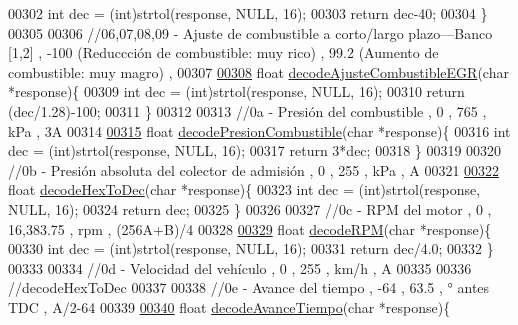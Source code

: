 \begin{DoxyCode}
{00302     \textcolor{keywordtype}{int} dec = (int)strtol(response, NULL, 16);
00303     \textcolor{keywordflow}{return} dec-40;
00304 \}
00305 
00306 \textcolor{comment}{//06,07,08,09 - Ajuste de combustible a corto/largo plazo—Banco [1,2] , -100 (Reduccción de combustible:
       muy rico) , 99.2 (Aumento de combustible: muy magro) , %
00307 
\hyperlink{decoders_8hpp_aeee9e6d8511a934b3a3644b19de3f2b7}{00308} \textcolor{keywordtype}{float} \hyperlink{decoders_8cpp_aeee9e6d8511a934b3a3644b19de3f2b7}{decodeAjusteCombustibleEGR}(\textcolor{keywordtype}{char} *response)\{
00309     \textcolor{keywordtype}{int} dec = (int)strtol(response, NULL, 16);
00310     \textcolor{keywordflow}{return} (dec/1.28)-100;
00311 \}
00312 
00313 \textcolor{comment}{//0a - Presión del combustible , 0 , 765 , kPa , 3A}
00314 
\hyperlink{decoders_8hpp_ab1c03e72734d4127a1c48f3b5a44a2e2}{00315} \textcolor{keywordtype}{float} \hyperlink{decoders_8cpp_ab1c03e72734d4127a1c48f3b5a44a2e2}{decodePresionCombustible}(\textcolor{keywordtype}{char} *response)\{
00316     \textcolor{keywordtype}{int} dec = (int)strtol(response, NULL, 16);
00317     \textcolor{keywordflow}{return} 3*dec;
00318 \}
00319 
00320 \textcolor{comment}{//0b - Presión absoluta del colector de admisión , 0 , 255 , kPa , A}
00321 
\hyperlink{decoders_8hpp_aa7c5243702d5462e4b638450e750624e}{00322} \textcolor{keywordtype}{float} \hyperlink{decoders_8cpp_aa7c5243702d5462e4b638450e750624e}{decodeHexToDec}(\textcolor{keywordtype}{char} *response)\{
00323     \textcolor{keywordtype}{int} dec = (int)strtol(response, NULL, 16);
00324     \textcolor{keywordflow}{return} dec;
00325 \}
00326 
00327 \textcolor{comment}{//0c - RPM del motor , 0 , 16,383.75 , rpm , (256A+B)/4 }
00328 
\hyperlink{decoders_8hpp_a889868c7b1e554aee496e6aed7101cc4}{00329} \textcolor{keywordtype}{float} \hyperlink{decoders_8cpp_a889868c7b1e554aee496e6aed7101cc4}{decodeRPM}(\textcolor{keywordtype}{char} *response)\{
00330     \textcolor{keywordtype}{int} dec = (int)strtol(response, NULL, 16);
00331     \textcolor{keywordflow}{return} dec/4.0;
00332 \}
00333 
00334 \textcolor{comment}{//0d - Velocidad del vehículo , 0 , 255 , km/h , A}
00335 
00336 \textcolor{comment}{//decodeHexToDec}
00337 
00338 \textcolor{comment}{//0e - Avance del tiempo , -64 , 63.5 , ° antes TDC , A/2-64 }
00339 
\hyperlink{decoders_8hpp_a7a2fee87eace8ad6c86c628f5f91b3b5}{00340} \textcolor{keywordtype}{float} \hyperlink{decoders_8cpp_a7a2fee87eace8ad6c86c628f5f91b3b5}{decodeAvanceTiempo}(\textcolor{keywordtype}{char} *response)\{
}}
\end{DoxyCode}
